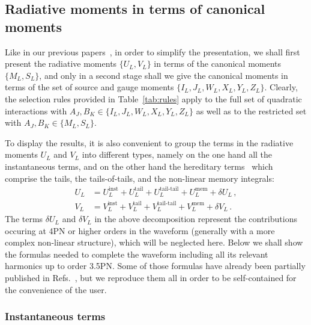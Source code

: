 \documentclass[prd,preprint,superscriptaddress,tightenlines,nofootinbib,
  eqsecnum,showpacs]{revtex4}
\begin{document}
\subsection{Radiative moments in terms of canonical moments}
\label{sec:radcan}

Like in our previous papers~\cite{BFIS08, FMBI12}, in order to
simplify the presentation, we shall first present the radiative
moments $\{U_L, V_L\}$ in terms of the canonical moments $\{M_L,
S_L\}$, and only in a second stage shall we give the canonical moments
in terms of the set of source and gauge moments $\{I_L, J_L, W_L, X_L,
Y_L, Z_L\}$. Clearly, the selection rules provided in
Table~\ref{tab:rules} apply to the full set of quadratic interactions
with $A_J, B_K \in \{I_L, J_L, W_L, X_L, Y_L, Z_L\}$ as well as to the
restricted set with $A_J, B_K \in \{M_L, S_L\}$.

To display the results, it is also convenient to group the terms in
the radiative moments $U_L$ and $V_L$ into different types, namely on
the one hand all the instantaneous terms, and on the other hand the
hereditary terms~\cite{BD92} which comprise the tails, the
tails-of-tails, and the non-linear memory integrals:
%
\begin{subequations}\label{UVL}
\begin{align}
U_L &= U_L^\text{inst} + U_L^\text{tail} + U_L^\text{tail-tail} +
U_L^\text{mem} + \delta U_L\,,\\ V_L &= V_L^\text{inst} +
V_L^\text{tail} + V_L^\text{tail-tail} + V_L^\text{mem} + \delta
  V_L\,.
\end{align}\end{subequations}
%
The terms $\delta U_L$ and $\delta V_L$ in the above decomposition represent
the contributions occuring at 4PN or higher orders in the waveform (generally
with a more complex non-linear structure), which will be neglected here. Below
we shall show the formulas needed to complete the waveform including all its
relevant harmonics up to order 3.5PN. Some of those formulas have already been
partially published in Refs.~\cite{BFIS08, FMBI12}, but we reproduce them all
in order to be  self-contained for the convenience of the user.

\subsubsection{Instantaneous terms}
\label{sec:inst}
\end{document}
